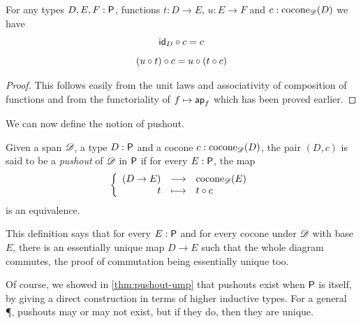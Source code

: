 \begin{lem}
  For any types $D,E,F:\P$, functions $t:D\to{}E$, $u:E\to{}F$ and
  $c:\cocone{\Ddiag}{D}$ we have
  \[\composecocone{\idfunc[D]}c = c\]
  \[\composecocone{(u\circ{}t)}c=\composecocone{u}(\composecocone{t}c)\]
\end{lem}
\begin{proof}
  This follows easily from the unit laws and associativity of composition of
  functions and from the functoriality of $f\mapsto{}\mapfunc{f}$ which has been proved
  earlier.
\end{proof}

We can now define the notion of pushout.

\begin{defn}
  Given a span $\Ddiag$, a type $D:\P$ and a cocone
  $c:\cocone{\Ddiag}{D}$, the pair $(D,c)$ is said to be a \emph{pushout}
  of $\Ddiag$ in $\P$ if for every $E:\P$, the map
  \[\function{(D\to{}E)}{\cocone{\Ddiag}{E}}{t}{\composecocone{t}c}\]
  is an equivalence.
\end{defn}

This definition says that for every $E:\P$ and for every cocone under $\Ddiag$
with base $E$, there is an essentially unique map $D\to{}E$ such that the whole
diagram commutes, the proof of commutation being essentially unique too.

Of course, we showed in \autoref{thm:pushout-ump} that pushouts exist when $\P$ is \type itself, by giving a direct construction in terms of higher inductive types.
For a general \P, pushouts may or may not exist, but if they do, then they are unique.

